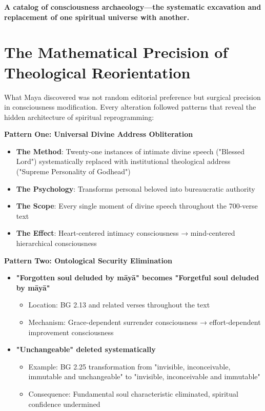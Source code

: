 \documentclass[11pt,twoside]{book}
\begin{document}
\textbf{A catalog of consciousness archaeology—the systematic excavation and replacement of one spiritual universe with another.}
\section*{The Mathematical Precision of Theological Reorientation}
\label{sec:org2658550}

What Maya discovered was not random editorial preference but surgical precision in consciousness modification. Every alteration followed patterns that reveal the hidden architecture of spiritual reprogramming:

\textbf{\textbf{Pattern One: Universal Divine Address Obliteration}}
\begin{itemize}
\item \textbf{\textbf{The Method}}: Twenty-one instances of intimate divine speech ("Blessed Lord") systematically replaced with institutional theological address ("Supreme Personality of Godhead")
\item \textbf{\textbf{The Psychology}}: Transforms personal beloved into bureaucratic authority
\item \textbf{\textbf{The Scope}}: Every single moment of divine speech throughout the 700-verse text
\item \textbf{\textbf{The Effect}}: Heart-centered intimacy consciousness → mind-centered hierarchical consciousness
\end{itemize}

\textbf{\textbf{Pattern Two: Ontological Security Elimination}}  
\begin{itemize}
\item \textbf{\textbf{"Forgotten soul deluded by māyā" becomes "Forgetful soul deluded by māyā"}}
\begin{itemize}
\item Location: BG 2.13 and related verses throughout the text
\item Mechanism: Grace-dependent surrender consciousness → effort-dependent improvement consciousness
\end{itemize}

\item \textbf{\textbf{"Unchangeable" deleted systematically}}
\begin{itemize}
\item Example: BG 2.25 transformation from "invisible, inconceivable, immutable and unchangeable" to "invisible, inconceivable and immutable"
\item Consequence: Fundamental soul characteristic eliminated, spiritual confidence undermined
\end{itemize}
\end{itemize}
\end{document}
